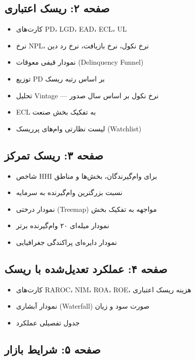 \documentclass[12pt,a4paper]{article}
\begin{document}
\subsection{صفحه ۲: ریسک اعتباری}

\begin{itemize}
    \item کارت‌های PD، LGD، EAD، ECL، UL
    \item نرخ NPL، نرخ نکول، نرخ بازیافت، نرخ رد دین
    \item نمودار قیفی معوقات (Delinquency Funnel)
    \item توزیع PD بر اساس رتبه ریسک
    \item تحلیل Vintage — نرخ نکول بر اساس سال صدور
    \item ECL به تفکیک بخش صنعت
    \item لیست نظارتی وام‌های پرریسک (Watchlist)
\end{itemize}

\subsection{صفحه ۳: ریسک تمرکز}

\begin{itemize}
    \item شاخص HHI برای وام‌گیرندگان، بخش‌ها و مناطق
    \item نسبت بزرگترین وام‌گیرنده به سرمایه
    \item نمودار درختی (Treemap) مواجهه به تفکیک بخش
    \item نمودار میله‌ای ۲۰ وام‌گیرنده برتر
    \item نمودار دایره‌ای پراکندگی جغرافیایی
\end{itemize}

\subsection{صفحه ۴: عملکرد تعدیل‌شده با ریسک}

\begin{itemize}
    \item کارت‌های RAROC، NIM، ROA، ROE، هزینه ریسک اعتباری
    \item نمودار آبشاری (Waterfall) صورت سود و زیان
    \item جدول تفصیلی عملکرد
\end{itemize}

\subsection{صفحه ۵: شرایط بازار}
\end{document}
